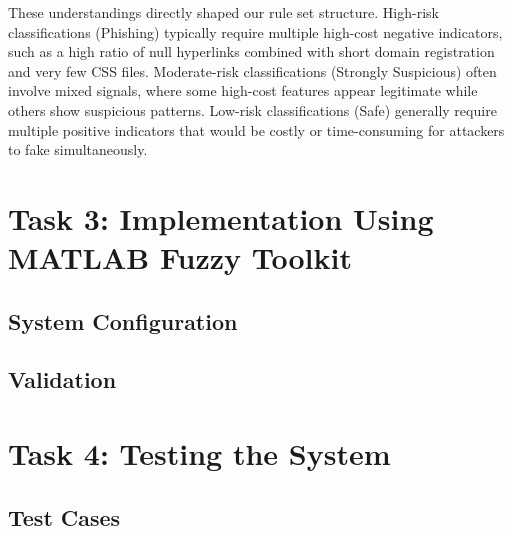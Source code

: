 \documentclass{article}
\begin{document}
These understandings directly shaped our rule set structure. High-risk classifications (Phishing) typically require multiple high-cost negative indicators, such as a high ratio of null hyperlinks combined with short domain registration and very few CSS files. Moderate-risk classifications (Strongly Suspicious) often involve mixed signals, where some high-cost features appear legitimate while others show suspicious patterns. Low-risk classifications (Safe) generally require multiple positive indicators that would be costly or time-consuming for attackers to fake simultaneously.

\section{Task 3: Implementation Using MATLAB Fuzzy Toolkit}


\subsection{System Configuration}


\subsection{Validation}


\section{Task 4: Testing the System}


\subsection{Test Cases}
\end{document}
